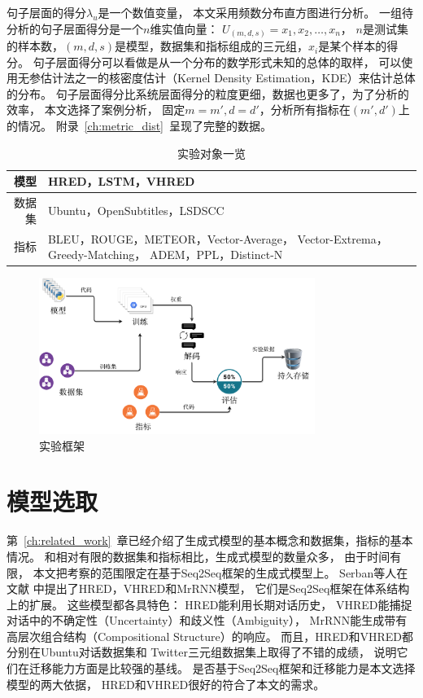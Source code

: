 句子层面的得分$\lambda_u$是一个数值变量，
本文采用频数分布直方图进行分析。
一组待分析的句子层面得分是一个$n$维实值向量： $U_{(m, d, s)} = x_1, x_2, \dots, x_n$，
$n$是测试集的样本数，$(m, d, s)$是模型，数据集和指标组成的三元组，$x_i$是某个样本的得分。
句子层面得分可以看做是从一个分布的数学形式未知的总体的取样，
可以使用无参估计法之一的核密度估计（Kernel Density Estimation，KDE）来估计总体的分布。
句子层面得分比系统层面得分的粒度更细，数据也更多了，为了分析的效率，
本文选择了案例分析，
固定$m = m', d = d'$，分析所有指标在$(m', d')$上的情况。
附录~\ref{ch:metric_dist}~呈现了完整的数据。

\begin{table}[H]
    \centering
    \caption{实验对象一览}
    \label{tab:experiment_triples}
    \begin{tabular}{|r|m{}|}
        \hline
        模型 & HRED，LSTM，VHRED \\
        \hline
        数据集 & Ubuntu，OpenSubtitles，LSDSCC \\
        \hline
        指标 & BLEU，ROUGE，METEOR，Vector-Average，
        Vector-Extrema，Greedy-Matching，
        ADEM，PPL，Distinct-N \\
        \hline
    \end{tabular}
\end{table}

\begin{figure}[H]
    \centering
    \includegraphics[width=0.8\textwidth]{figure/drawio/eval_v4.pdf}
    \caption{实验框架}
    \label{fig:framework}
\end{figure}

\section{模型选取}\label{sec:model_selection}
第~\ref{ch:related_work}~章已经介绍了生成式模型的基本概念和数据集，指标的基本情况。
和相对有限的数据集和指标相比，生成式模型的数量众多，
由于时间有限，
本文把考察的范围限定在基于Seq2Seq框架的生成式模型上。
Serban等人在文献\cite{HRED,VHRED,MrRNN}
中提出了HRED，VHRED和MrRNN模型，
它们是Seq2Seq框架在体系结构上的扩展。
这些模型都各具特色：
HRED能利用长期对话历史，
VHRED能捕捉对话中的不确定性（Uncertainty）和歧义性（Ambiguity），
MrRNN能生成带有高层次组合结构（Compositional Structure）的响应。
而且，HRED和VHRED都分别在Ubuntu对话数据集和
Twitter三元组数据集上取得了不错的成绩，
说明它们在迁移能力方面是比较强的基线。
是否基于Seq2Seq框架和迁移能力是本文选择模型的两大依据，
HRED和VHRED很好的符合了本文的需求。


